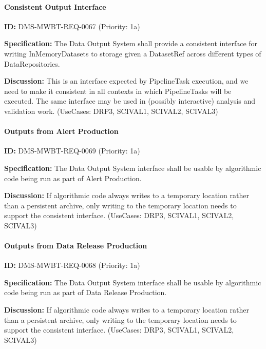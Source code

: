 \documentclass[SE,toc,lsstdraft]{lsstdoc}
\begin{document}
\paragraph{Consistent Output Interface}\hfill  %

\label{DMS-MWBT-REQ-0067}
\textbf{ID:} DMS-MWBT-REQ-0067 (Priority: 1a)

\textbf{Specification:}
The Data Output System shall provide a consistent interface for writing InMemoryDatasets to storage given a DatasetRef across different types of DataRepositories.

\textbf{Discussion:}
This is an interface expected by PipelineTask execution, and we need to make it consistent in all contexts in which PipelineTasks will be executed. The same interface may be used in (possibly interactive) analysis and validation work. (UseCases: DRP3, SCIVAL1, SCIVAL2, SCIVAL3)

\paragraph{Outputs from Alert Production}\hfill  %

\label{DMS-MWBT-REQ-0069}
\textbf{ID:} DMS-MWBT-REQ-0069 (Priority: 1a)

\textbf{Specification:}
The Data Output System interface shall be usable by algorithmic code being run as part of Alert Production.

\textbf{Discussion:}
If algorithmic code always writes to a temporary location rather than a persistent archive, only writing to the temporary location needs to support the consistent interface. (UseCases: DRP3, SCIVAL1, SCIVAL2, SCIVAL3)

\paragraph{Outputs from Data Release Production}\hfill  %

\label{DMS-MWBT-REQ-0068}
\textbf{ID:} DMS-MWBT-REQ-0068 (Priority: 1a)

\textbf{Specification:}
The Data Output System interface shall be usable by algorithmic code being run as part of Data Release Production.

\textbf{Discussion:}
If algorithmic code always writes to a temporary location rather than a persistent archive, only writing to the temporary location needs to support the consistent interface. (UseCases: DRP3, SCIVAL1, SCIVAL2, SCIVAL3)
\end{document}
